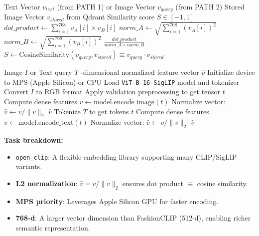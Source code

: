 \begin{algorithm}[H]
\caption{Cosine Similarity for Cross-Modal Matching}\label{alg:cosine_sim}
\begin{algorithmic}[1]
\Require Text Vector $v_{text}$ (from PATH 1) or Image Vector $v_{query}$ (from PATH 2)
\Require Stored Image Vector $v_{stored}$ from Qdrant
\Ensure Similarity score $S \in [-1, 1]$
    \State $dot\_product \gets \sum_{i=1}^{768} v_A[i] \times v_B[i]$
    \State $norm\_A \gets \sqrt{\sum_{i=1}^{768} (v_A[i])^2}$
    \State $norm\_B \gets \sqrt{\sum_{i=1}^{768} (v_B[i])^2}$
    \State \Return $\frac{dot\_product}{norm\_A \times norm\_B}$
\EndFunction
\State {}
\State $S \gets \text{CosineSimilarity}(v_{query}, v_{stored}) \equiv v_{query} \cdot v_{stored}$
\end{algorithmic}
\end{algorithm}

\begin{algorithm}[H]
\caption{Cross-Modal Encoding via Marqo-FashionSigLIP}\label{alg:fashionsiglip}
\begin{algorithmic}[1]
\Require Image $I$ or Text query $T$
-dimensional normalized feature vector $\hat{v}$
\State Initialize device to MPS (Apple Silicon) or CPU
\State Load \texttt{ViT-B-16-SigLIP} model and tokenizer
    \State Convert $I$ to RGB format
    \State Apply validation preprocessing to get tensor $t$
    \State Compute dense features $v \gets \text{model.encode\_image}(t)$
    \State Normalize vector: $\hat{v} \gets v / \|v\|_2$
    \State \Return $\hat{v}$
\EndFunction
\State
{}
    \State Tokenize $T$ to get tokens $t$
    \State Compute dense features $v \gets \text{model.encode\_text}(t)$
    \State Normalize vector: $\hat{v} \gets v / \|v\|_2$
    \State \Return $\hat{v}$
\EndFunction
\end{algorithmic}
\end{algorithm}

\textbf{Task breakdown:}
\begin{itemize}
    \item \texttt{open\_clip}: A flexible embedding library supporting many CLIP/SigLIP variants.
    \item \textbf{L2 normalization}: $\hat{v} = v / \|v\|_2$ ensures dot product $\equiv$ cosine similarity.
    \item \textbf{MPS priority}: Leverages Apple Silicon GPU for faster encoding.
    \item \textbf{768-d}: A larger vector dimension than FashionCLIP (512-d), enabling richer semantic representation.
\end{itemize}

